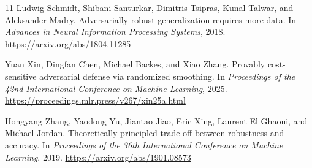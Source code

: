 \documentclass[11pt]{article}
\theoremstyle{definition}
\theoremstyle{plain}
\theoremstyle{remark}
\begin{document}
\begin{thebibliography}{11}
Ludwig Schmidt, Shibani Santurkar, Dimitris Tsipras, Kunal Talwar, and Aleksander Madry.
\newblock Adversarially robust generalization requires more data.
\newblock In \emph{Advances in Neural Information Processing Systems}, 2018.
\newblock \url{https://arxiv.org/abs/1804.11285}

Yuan Xin, Dingfan Chen, Michael Backes, and Xiao Zhang.
\newblock Provably cost-sensitive adversarial defense via randomized smoothing.
\newblock In \emph{Proceedings of the 42nd International Conference on Machine Learning}, 2025.
\newblock \url{https://proceedings.mlr.press/v267/xin25a.html}

Hongyang Zhang, Yaodong Yu, Jiantao Jiao, Eric Xing, Laurent El Ghaoui, and Michael Jordan.
\newblock Theoretically principled trade-off between robustness and accuracy.
\newblock In \emph{Proceedings of the 36th International Conference on Machine Learning}, 2019.
\newblock \url{https://arxiv.org/abs/1901.08573}

\end{thebibliography}
\end{document}
